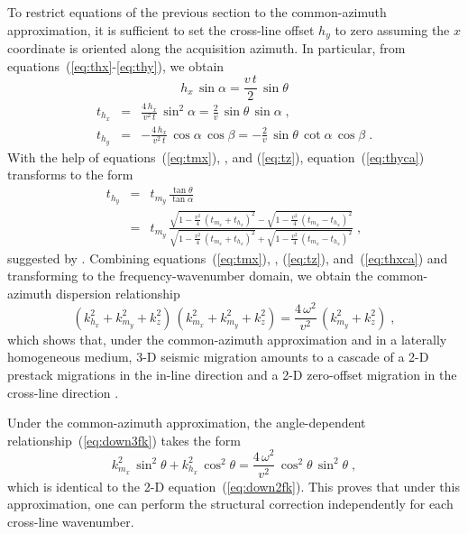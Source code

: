 To restrict equations of the previous section to the common-azimuth
approximation, it is sufficient to set the cross-line offset $h_y$ to zero
assuming the $x$ coordinate is oriented along the acquisition azimuth. In
particular, from equations~(\ref{eq:thx}-\ref{eq:thy}), we obtain
\begin{equation}
  \label{eq:hxca}
  h_x\,\sin{\alpha} = \frac{v\,t}{2}\,\sin{\theta}
\end{equation}
\begin{eqnarray}
  \label{eq:thxca}
  t_{h_x} &  = &
  \frac{4\,h_x}{v^2\,t}\,\sin^2{\alpha} 
  = \frac{2}{v}\,\sin{\theta}\,\sin{\alpha}\;,
  \\ \label{eq:thyca}
  t_{h_y} &  = & 
  -\frac{4\,h_x}{v^2\,t}\,\cos{\alpha}\,\cos{\beta}
  = - \frac{2}{v}\,\sin{\theta}\,\cot{\alpha}\,\cos{\beta}\;.
\end{eqnarray}
With the help of equations~(\ref{eq:tmx}), \old{(\ref{eq:tmx})}
\new{(\ref{eq:tmy})}, and (\ref{eq:tz}), equation~(\ref{eq:thyca})
transforms to the form
\begin{eqnarray}
  \nonumber
  t_{h_y} & = & t_{m_y}\,\frac{\tan{\theta}}{\tan{\alpha}} \\
  & = &
  t_{m_y}\,\frac{
    \sqrt{1-\frac{v^2}{4}\,\left(t_{m_x}+t_{h_x}\right)^2} -
    \sqrt{1-\frac{v^2}{4}\,\left(t_{m_x}-t_{h_x}\right)^2}}
  {\sqrt{1-\frac{v^2}{4}\,\left(t_{m_x}+t_{h_x}\right)^2} +
    \sqrt{1-\frac{v^2}{4}\,\left(t_{m_x}-t_{h_x}\right)^2}}\;,
  \label{eq:biondo}
\end{eqnarray}
suggested by \cite{GEO61-06-18221832}. Combining equations~(\ref{eq:tmx}),
\old{(\ref{eq:tmx})} \new{(\ref{eq:tmy})}, (\ref{eq:tz}), and~(\ref{eq:thxca}) and transforming to the
frequency-wavenumber domain, we obtain the common-azimuth dispersion
relationship
\begin{equation}
  \label{eq:comaz}
  \left(k_{h_x}^2 + k_{m_y}^2 + k_z^2\right)\,
  \left(k_{m_x}^2 + k_{m_y}^2 + k_z^2\right) =
  \frac{4\,\omega^2}{v^2}\,\left(k_{m_y}^2 + k_z^2\right)\;,
\end{equation}
which shows that, under the common-azimuth approximation and in a laterally
homogeneous medium, 3-D seismic migration amounts to a cascade of a 
2-D prestack migrations in the in-line direction and a 2-D zero-offset
migration in the cross-line direction \cite[]{GEO61-02-04090421}.  

Under the common-azimuth approximation, the angle-dependent
relationship~(\ref{eq:down3fk}) takes the form
\begin{equation}
  \label{eq:down2ca}
  k_{m_x}^2\,\sin^2{\theta} +
  k_{h_x}^2\,\cos^2{\theta}
  = \frac{4\,\omega^2}{v^2}\,\cos^2{\theta}\,\sin^2{\theta}\;,
\end{equation}
which is identical to the 2-D equation~(\ref{eq:down2fk}). This proves that
under this approximation, one can perform the structural correction
independently for each cross-line wavenumber.

